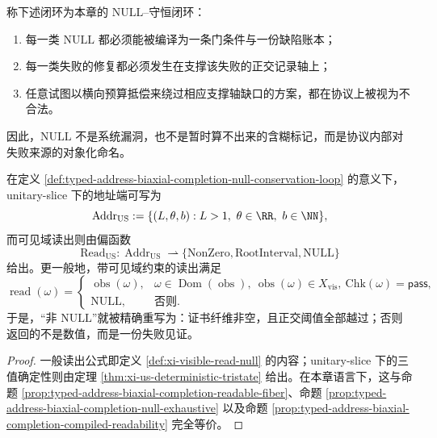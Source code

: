 \begin{definition}\label{def:typed-address-biaxial-completion-null-conservation-loop}
称下述闭环为本章的 \(\mathrm{NULL}\)--守恒闭环：
\begin{enumerate}
  \item 每一类 \(\mathrm{NULL}\) 都必须能被编译为一条门条件与一份缺陷账本；
  \item 每一类失败的修复都必须发生在支撑该失败的正交记录轴上；
  \item 任意试图以横向预算抵偿来绕过相应支撑轴缺口的方案，都在协议上被视为不合法。
\end{enumerate}
因此，\(\mathrm{NULL}\) 不是系统漏洞，也不是暂时算不出来的含糊标记，而是协议内部对失败来源的对象化命名。
\end{definition}

\begin{proposition}\label{prop:typed-address-biaxial-completion-unitary-slice-address-closure}
在定义 \ref{def:typed-address-biaxial-completion-null-conservation-loop} 的意义下，unitary-slice 下的地址端可写为
\[
\operatorname{Addr}_{\mathrm{US}}
:=
\{(L,\theta,b):L>1,\ \theta\in\RR,\ b\in\NN\},
\]
而可见域读出则由偏函数
\[
\mathrm{Read}_{\mathrm{US}}:
\operatorname{Addr}_{\mathrm{US}}
\rightharpoonup
\{\mathrm{NonZero},\mathrm{RootInterval},\mathrm{NULL}\}
\]
给出。更一般地，带可见域约束的读出满足
\[
\operatorname{read}(\omega)=
\begin{cases}
\operatorname{obs}(\omega),&
\omega\in\operatorname{Dom}(\operatorname{obs}),\ \operatorname{obs}(\omega)\in X_{\mathrm{vis}},\ \mathrm{Chk}(\omega)=\mathsf{pass},\\
\mathrm{NULL},& \text{否则}.
\end{cases}
\]
于是，“非 \(\mathrm{NULL}\)”就被精确重写为：证书纤维非空，且正交阈值全部越过；否则返回的不是数值，而是一份失败见证。
\end{proposition}
\begin{proof}
一般读出公式即定义 \ref{def:xi-visible-read-null} 的内容；unitary-slice 下的三值确定性则由定理 \ref{thm:xi-us-deterministic-tristate} 给出。在本章语言下，这与命题 \ref{prop:typed-address-biaxial-completion-readable-fiber}、命题 \ref{prop:typed-address-biaxial-completion-null-exhaustive} 以及命题 \ref{prop:typed-address-biaxial-completion-compiled-readability} 完全等价。
\end{proof}

